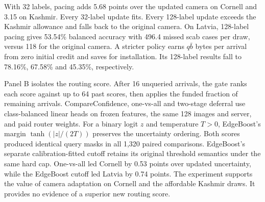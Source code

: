 With 32 labels, pacing adds 5.68 points over the updated camera on Cornell and 3.15 on Kashmir. Every 32-label update fits. Every 128-label update exceeds the Kashmir allowance and falls back to the original camera. On Latvia, 128-label pacing gives 53.54\% balanced accuracy with 496.4 missed scab cases per draw, versus 118 for the original camera. A stricter policy earns $q\bar b$ bytes per arrival from zero initial credit and saves for installation. Its 128-label results fall to 78.16\%, 67.58\% and 45.35\%, respectively.

Panel B isolates the routing score. After 16 unqueried arrivals, the gate ranks each score against up to 64 past scores, then applies the funded fraction of remaining arrivals. CompareConfidence, one-vs-all and two-stage deferral \cite{cc,ova,mao} use class-balanced linear heads on frozen features, the same 128 images and server, and paid router weights. For a binary logit $z$ and temperature $T>0$, EdgeBoost's margin \cite{edgeboost} $\tanh(|z|/(2T))$ preserves the uncertainty ordering. Both scores produced identical query masks in all 1,320 paired comparisons. EdgeBoost's separate calibration-fitted cutoff retains its original threshold semantics under the same hard cap. One-vs-all led Cornell by 0.53 points over updated uncertainty, while the EdgeBoost cutoff led Latvia by 0.74 points. The experiment supports the value of camera adaptation on Cornell and the affordable Kashmir draws. It provides no evidence of a superior new routing score.
